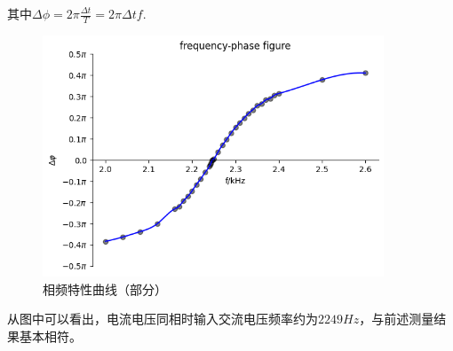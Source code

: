 \documentclass[12pt, a4paper]{ctexart}
\begin{document}
其中$\Delta \phi = 2\pi \frac{\Delta t}{T} = 2\pi \Delta tf$.
\begin{figure}
    \centering
    \includegraphics[width = 4in]{figure/frequency-phase figure.png}
    \caption{相频特性曲线（部分）}
    \label{fig1}
\end{figure}

从图中可以看出，电流电压同相时输入交流电压频率约为$2249Hz$，与前述测量结果基本相符。
\end{document}
